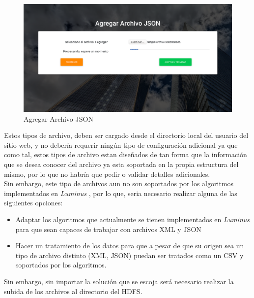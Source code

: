 \begin{figure}[H]
	\hypertarget{fig:red}{\hspace{1pt}}
	\begin{center}
		\includegraphics[width=.9\textwidth]{capitulo7/images/agregarJSON.png}
		\caption{Agregar Archivo JSON}
		\label{fig:XML}
	\end{center}
\end{figure}
Estos tipos de archivo, deben ser cargado desde el directorio local del usuario del sitio web, y no debería requerir ningún tipo de configuración adicional ya que como tal, estos tipos de archivo estan diseñados de tan forma que la información que se desea conocer del archivo ya esta soportada en la propia estructura del mismo, por lo que no habría que pedir o validar detalles adicionales.\\
Sin embargo, este tipo de archivos aun no son soportados por los algoritmos implementados en \emph{Luminus} , por lo que, seria necesario realizar alguna de las siguientes opciones:
\begin{itemize}
	\item Adaptar los algoritmos que actualmente se tienen implementados en \emph{Luminus} para que sean capaces de trabajar con archivos XML y JSON
	\item Hacer un tratamiento de los datos para que a pesar de que su origen sea un tipo de archivo distinto (XML, JSON) puedan ser tratados como un CSV y soportados por los algoritmos. 
\end{itemize} 
Sin embargo, sin importar la solución que se escoja será necesario realizar la subida de los archivos al directorio del HDFS.\\

